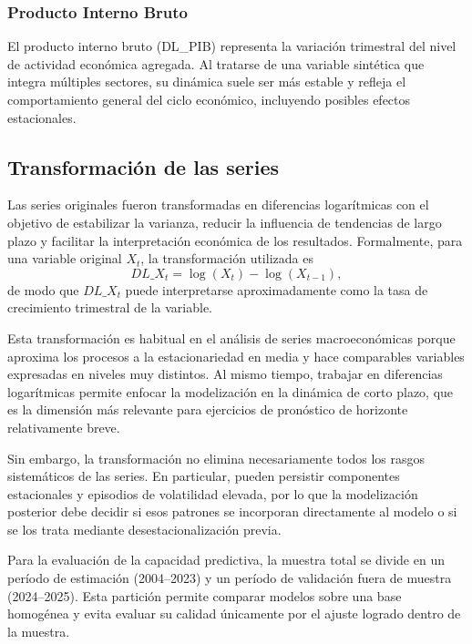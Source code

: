 \documentclass[11pt]{article}
\begin{document}
\subsubsection{Producto Interno Bruto}

\begin{sloppypar}
El producto interno bruto (DL\_PIB) representa la variación trimestral del nivel de actividad económica agregada. Al tratarse de una variable sintética que integra múltiples sectores, su dinámica suele ser más estable y refleja el comportamiento general del ciclo económico, incluyendo posibles efectos estacionales.
\end{sloppypar}

\subsection{Transformación de las series}

Las series originales fueron transformadas en diferencias logarítmicas con el objetivo de estabilizar la varianza, reducir la influencia de tendencias de largo plazo y facilitar la interpretación económica de los resultados. Formalmente, para una variable original $X_t$, la transformación utilizada es
\[
DL\_X_t = \log(X_t) - \log(X_{t-1}),
\]
de modo que $DL\_X_t$ puede interpretarse aproximadamente como la tasa de crecimiento trimestral de la variable.

Esta transformación es habitual en el análisis de series macroeconómicas porque aproxima los procesos a la estacionariedad en media y hace comparables variables expresadas en niveles muy distintos. Al mismo tiempo, trabajar en diferencias logarítmicas permite enfocar la modelización en la dinámica de corto plazo, que es la dimensión más relevante para ejercicios de pronóstico de horizonte relativamente breve.

Sin embargo, la transformación no elimina necesariamente todos los rasgos sistemáticos de las series. En particular, pueden persistir componentes estacionales y episodios de volatilidad elevada, por lo que la modelización posterior debe decidir si esos patrones se incorporan directamente al modelo o si se los trata mediante desestacionalización previa.

Para la evaluación de la capacidad predictiva, la muestra total se divide en un período de estimación (2004–2023) y un período de validación fuera de muestra (2024–2025). Esta partición permite comparar modelos sobre una base homogénea y evita evaluar su calidad únicamente por el ajuste logrado dentro de la muestra.
\end{document}
